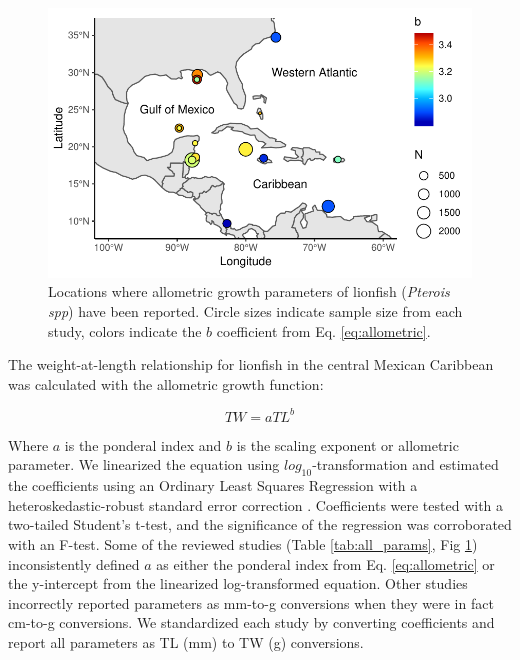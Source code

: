 \documentclass[fleqn,10pt,lineno]{wlpeerj} %
\begin{document}
\begin{figure}
\centering
\includegraphics{Manuscript_files/figure-latex/map-1.pdf}
\caption{\label{fig:map}Locations where allometric growth parameters of
lionfish (\emph{Pterois spp}) have been reported. Circle sizes indicate
sample size from each study, colors indicate the \(b\) coefficient from
Eq. \ref{eq:allometric}.}
\end{figure}

The weight-at-length relationship for lionfish in the central Mexican
Caribbean was calculated with the allometric growth function:

\begin{equation}
\label{eq:allometric}
TW = aTL^b
\end{equation}

Where \(a\) is the ponderal index and \(b\) is the scaling exponent or
allometric parameter. We linearized the equation using
\(log_{10}\)-transformation and estimated the coefficients using an
Ordinary Least Squares Regression with a heteroskedastic-robust standard
error correction \citep{zeileis_2004}. Coefficients were tested with a
two-tailed Student's t-test, and the significance of the regression was
corroborated with an F-test. Some of the reviewed studies (Table
\ref{tab:all_params}, Fig \ref{fig:map}) inconsistently defined \(a\) as
either the ponderal index from Eq. \ref{eq:allometric} or the
y-intercept from the linearized log-transformed equation. Other studies
incorrectly reported parameters as mm-to-g conversions when they were in
fact cm-to-g conversions. We standardized each study by converting
coefficients and report all parameters as TL (mm) to TW (g) conversions.
\end{document}
